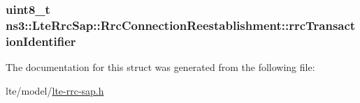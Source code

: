 \subsubsection[{\texorpdfstring{rrc\+Transaction\+Identifier}{rrcTransactionIdentifier}}]{\setlength{\rightskip}{0pt plus 5cm}uint8\+\_\+t ns3\+::\+Lte\+Rrc\+Sap\+::\+Rrc\+Connection\+Reestablishment\+::rrc\+Transaction\+Identifier}\hypertarget{structns3_1_1LteRrcSap_1_1RrcConnectionReestablishment_acd894e6f1f5a38a2a87f5968a10802cd}{}\label{structns3_1_1LteRrcSap_1_1RrcConnectionReestablishment_acd894e6f1f5a38a2a87f5968a10802cd}


The documentation for this struct was generated from the following file\+:\begin{DoxyCompactItemize}
\item 
lte/model/\hyperlink{lte-rrc-sap_8h}{lte-\/rrc-\/sap.\+h}\end{DoxyCompactItemize}
